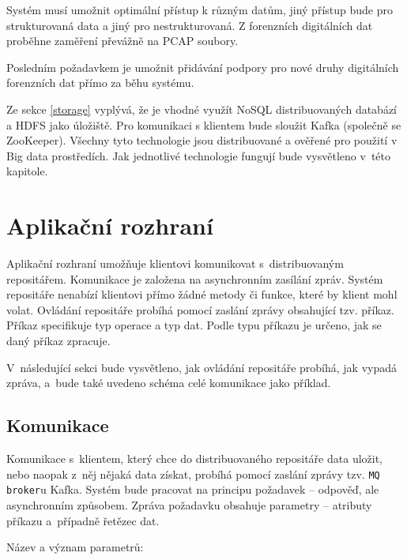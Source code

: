 Systém musí umožnit optimální přístup k různým datům, jiný přístup bude pro strukturovaná data a jiný pro nestrukturovaná. Z forenzních digitálních dat proběhne zaměření převážně na PCAP soubory.

Posledním požadavkem je umožnit přidávání podpory pro nové druhy digitálních forenzních dat přímo za běhu systému.

Ze sekce \ref{storage} vyplývá, že je vhodné využít NoSQL distribuovaných databází a HDFS jako úložiště. Pro komunikaci s klientem bude sloužit Kafka (společně se ZooKeeper). Všechny tyto technologie jsou distribuované a ověřené pro použití v Big data prostředích. Jak jednotlivé technologie fungují bude vysvětleno v~této kapitole.

\section{Aplikační rozhraní}
Aplikační rozhraní umožňuje klientovi komunikovat s~distribuovaným repositářem. Komunikace je založena na asynchronním zasílání zpráv. Systém repositáře nenabízí klientovi přímo žádné metody či funkce, které by klient mohl volat. Ovládání repositáře probíhá pomocí zaslání zprávy obsahující tzv. příkaz. Příkaz specifikuje typ operace a typ dat. Podle typu příkazu je určeno, jak se daný příkaz zpracuje.

V~následující sekci bude vysvětleno, jak ovládání repositáře probíhá, jak vypadá zpráva, a~bude také uvedeno schéma celé komunikace jako příklad.

\newpage
\subsection{Komunikace} \label{designCommunication}
Komunikace s~klientem, který chce do distribuovaného repositáře data uložit, nebo naopak z~něj nějaká data získat, probíhá pomocí zaslání zprávy tzv. \texttt{MQ broker}u Kafka. Systém bude pracovat na principu požadavek -- odpověď, ale asynchronním způsobem. Zpráva požadavku obsahuje parametry -- atributy příkazu a~případně řetězec dat.

\vspace{0.5cm}
\noindent Název a význam parametrů:

